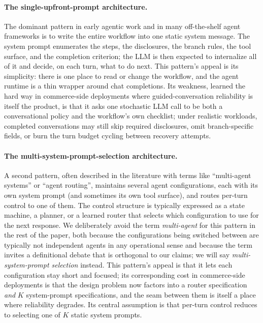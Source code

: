 \documentclass[11pt,a4paper]{article}
\begin{document}
\paragraph{The single-upfront-prompt architecture.}
The dominant pattern in early agentic work and in many off-the-shelf agent frameworks is to write the entire workflow into one static system message. The system prompt enumerates the steps, the disclosures, the branch rules, the tool surface, and the completion criterion; the LLM is then expected to internalize all of it and decide, on each turn, what to do next. This pattern's appeal is its simplicity: there is one place to read or change the workflow, and the agent runtime is a thin wrapper around chat completions. Its weakness, learned the hard way in commerce-side deployments where guided-conversation reliability is itself the product, is that it asks one stochastic LLM call to be both a conversational policy and the workflow's own checklist; under realistic workloads, completed conversations may still skip required disclosures, omit branch-specific fields, or burn the turn budget cycling between recovery attempts.

\paragraph{The multi-system-prompt-selection architecture.}
A second pattern, often described in the literature with terms like ``multi-agent systems'' or ``agent routing'', maintains several agent configurations, each with its own system prompt (and sometimes its own tool surface), and routes per-turn control to one of them. The control structure is typically expressed as a state machine, a planner, or a learned router that selects which configuration to use for the next response. We deliberately avoid the term \emph{multi-agent} for this pattern in the rest of the paper, both because the configurations being switched between are typically not independent agents in any operational sense and because the term invites a definitional debate that is orthogonal to our claims; we will say \emph{multi-system-prompt selection} instead. This pattern's appeal is that it lets each configuration stay short and focused; its corresponding cost in commerce-side deployments is that the design problem now factors into a router specification \emph{and} $K$ system-prompt specifications, and the seam between them is itself a place where reliability degrades. Its central assumption is that per-turn control reduces to selecting one of $K$ static system prompts.
\end{document}
